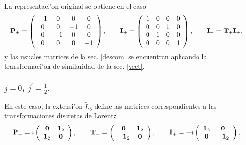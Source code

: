 La representaci'on original se obtiene en el caso 
\begin{equation}
{\bf P}_{+}=\left( 
\begin{array}{cccc}
-1 & 0 & 0 & 0 \\ 
0 & 0 & -1 & 0 \\ 
0 & -1 & 0 & 0 \\ 
0 & 0 & 0 & -1
\end{array}
\right) ,\qquad {\bf I}_{+}=\left( 
\begin{array}{cccc}
1 & 0 & 0 & 0 \\ 
0 & 0 & 1 & 0 \\ 
0 & 1 & 0 & 0 \\ 
0 & 0 & 0 & 1
\end{array}
\right) ,\qquad {\bf I}_{+}={\bf T}_{+}{\bf I}_{+}, 
\end{equation}
y las usuales matrices de la sec. \ref{descom} se encuentran aplicando la
transformaci'on de similaridad de la sec. \ref{vect}.

\subsubsection{$j=0$, $j^{\prime }=\frac{1}{2}.$}

En este caso, la extensi'on $\widetilde{L}_{8}$ define las matrices
correspondientes a las transformaciones discretas de Lorentz 
\begin{equation}
{\bf P}_{+}=i\left( 
\begin{array}{cc}
{\bf 0} & {\bf 1}_{2} \\ 
{\bf 1}_{2} & {\bf 0}
\end{array}
\right) ,\qquad {\bf T}_{+}=\left(
\begin{array}{cc}
{\bf 0} & {\bf 1}_{2} \\ 
-{\bf 1}_{2} & {\bf 0}
\end{array}
\right) ,\qquad {\bf I}_{+}=-i\left( 
\begin{array}{cc}
{\bf 1}_{2} & {\bf 0} \\ 
{\bf 0} & -{\bf 1}_{2}
\end{array}
\right) . 
\end{equation}

